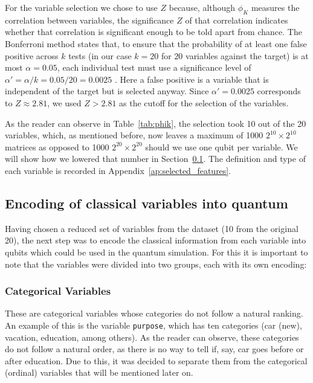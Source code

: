 \documentclass{ieeeaccess}
\begin{document}
For the variable selection we chose to use $Z$ because, although $\phi_{K}$ measures the correlation between variables, the significance $Z$ of that correlation indicates whether that correlation is significant enough to be told apart from chance. The Bonferroni method states that, to ensure that the probability of at least one false positive across $k$ tests (in our case $k = 20$ for $20$ variables against the target) is at most $\alpha = 0.05$, each individual test must use a significance level of $\alpha' = \alpha/k = 0.05/20 = 0.0025$ \cite{bland1995multiple}. Here a false positive is a variable that is independent of the target but is selected anyway. Since $\alpha' = 0.0025$ corresponds to $Z \approx 2.81$, we used $Z > 2.81$ as the cutoff for the selection of the variables.

As the reader can observe in Table~\ref{tab:phik}, the selection took 10 out of the 20 variables, which, as mentioned before, now leaves a maximum of 1000 $2^{10} \times 2^{10}$ matrices as opposed to 1000 $2^{20} \times 2^{20}$ should we use one qubit per variable. We will show how we lowered that number in Section~\ref{subsec:encoding_variables}. The definition and type of each variable is recorded in Appendix~\ref{ap:selected_features}.

\subsection{Encoding of classical variables into quantum}
\label{subsec:encoding_variables}

Having chosen a reduced set of variables from the dataset (10 from the original 20), the next step was to encode the classical information from each variable into qubits which could be used in the quantum simulation. For this it is important to note that the variables were divided into two groups, each with its own encoding:

\subsubsection{Categorical Variables}

These are categorical variables whose categories do not follow a natural ranking. An example of this is the variable \texttt{purpose}, which has ten categories (car (new), vacation, education, among others). As the reader can observe, these categories do not follow a natural order, as there is no way to tell if, say, car goes before or after education. Due to this, it was decided to separate them from the categorical (ordinal) variables that will be mentioned later on.
\end{document}
